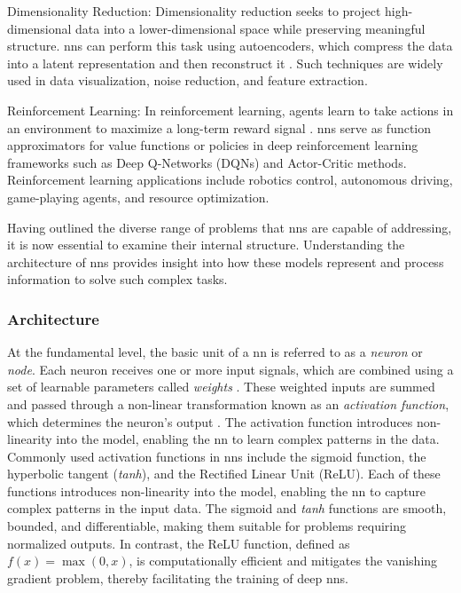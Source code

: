Dimensionality Reduction: Dimensionality reduction seeks to project high-dimensional data into a lower-dimensional space while preserving meaningful structure. \ac{nn}s can perform this task using autoencoders, which compress the data into a latent representation and then reconstruct it \parencite{hinton2006dimensionalityreduction}. Such techniques are widely used in data visualization, noise reduction, and feature extraction.

Reinforcement Learning: In reinforcement learning, agents learn to take actions in an environment to maximize a long-term reward signal \parencite[pp.~2--3]{sutton2015reinforcement}. \ac{nn}s serve as function approximators for value functions or policies in deep reinforcement learning frameworks such as Deep Q-Networks (DQNs) and Actor-Critic methods. Reinforcement learning  applications include robotics control, autonomous driving, game-playing agents, and resource optimization.

Having outlined the diverse range of problems that \ac{nn}s are capable of addressing, it is now essential to examine their internal structure. Understanding the architecture of \ac{nn}s provides insight into how these models represent and process information to solve such complex tasks.

\subsubsection{Architecture}
At the fundamental level, the basic unit of a \ac{nn} is referred to as a \textit{neuron} or \textit{node}. Each neuron receives one or more input signals, which are combined using a set of learnable parameters called \textit{weights} \parencite[p.~4]{mienye2024nncomprehensivereview}. These weighted inputs are summed and passed through a non-linear transformation known as an \textit{activation function}, which determines the neuron's output \parencite[pp.~4--5]{mienye2024nncomprehensivereview}. The activation function introduces non-linearity into the model, enabling the \ac{nn} to learn complex patterns in the data. Commonly used activation functions in \ac{nn}s include the sigmoid function, the hyperbolic tangent (\textit{\ac{tanh}}), and the Rectified Linear Unit (ReLU). Each of these functions introduces non-linearity into the model, enabling the \ac{nn} to capture complex patterns in the input data. The sigmoid and \textit{\ac{tanh}} functions are smooth, bounded, and differentiable, making them suitable for problems requiring normalized outputs. In contrast, the ReLU function, defined as $f(x) = \max(0, x)$, is computationally efficient and mitigates the vanishing gradient problem, thereby facilitating the training of deep \ac{nn}s.


